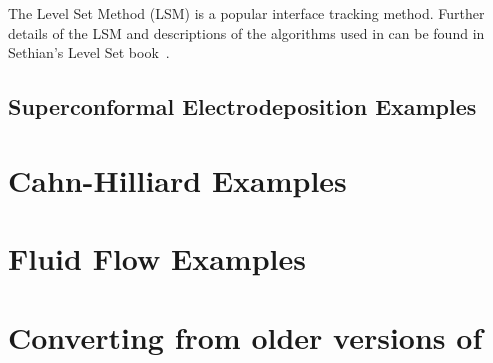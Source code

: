\documentclass[letterpaper,twoside,openright,10pt]{memoir}
\begin{document}
The Level Set Method (LSM) is a popular interface tracking
method. Further details of the LSM and descriptions of the algorithms
used in \FiPy{} can be found in Sethian's Level Set
book~\cite{levelSetBook}.






\newpage
\section*{Superconformal Electrodeposition Examples}








\chapter{Cahn-Hilliard Examples}


\label{sec:Examples:cahnHilliard:mesh2D}


\chapter{Fluid Flow Examples}



\chapter{Converting from older versions of \FiPy}
\label{chap:UpdateFiPy}





\backmatter
\end{document}
